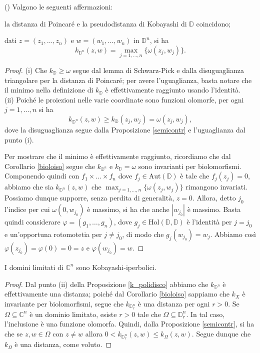 \begin{prop} \label{k_polidisco}
    (\cite[Proposition 2.3.4 and Corollary 2.3.7]{A1}) Valgono le seguenti affermazioni:
    \begin{nlist}
        \item la distanza di Poincaré e la pseudodistanza di Kobayashi di $\mathbb{D}$ coincidono;
        \item dati $z=(z_1,\dots,z_n)$ e $w=(w_1,\dots,w_n)$ in $\mathbb{D}^n$, si ha
        $$k_{\mathbb{D}^n}(z,w)=\max_{j=1,\dots,n}\{\omega(z_j,w_j)\}.$$
    \end{nlist}
\end{prop}
\begin{proof}
    (i) Che $k_{\mathbb{D}}\ge\omega$ segue dal lemma di Schwarz-Pick e dalla disuguaglianza triangolare per la distanza di Poincaré; per avere l'uguaglianza, basta notare che il minimo nella definizione di $k_{\mathbb{D}}$ è effettivamente raggiunto usando l'identità.\\

    (ii) Poiché le proiezioni nelle varie coordinate sono funzioni olomorfe, per ogni $j=1,\dots, n$ si ha
    $$k_{\mathbb{D}^n}(z,w) \ge k_{\mathbb{D}}(z_j,w_j)=\omega(z_j,w_j),$$
    dove la disuguaglianza segue dalla Proposizione \ref{semicontr} e l'uguaglianza dal punto (i).

    Per mostrare che il minimo è effettivamente raggiunto, ricordiamo che dal Corollario \ref{bioloiso} segue che $k_{\mathbb{D}^n}$ e $k_{\mathbb{D}}=\omega$ sono invarianti per biolomorfismi. Componendo quindi con $f_1\times\dots\times f_n$ dove $f_j \in \text{Aut}(\mathbb{D})$ è tale che $f_j(z_j)=0$, abbiamo che sia $k_{\mathbb{D}^n}(z,w)$ che $\displaystyle\max_{j=1,\dots,n}\{\omega(z_j,w_j)\}$ rimangono invariati. Possiamo dunque supporre, senza perdita di generalità, $z=0$. Allora, detto $j_0$ l'indice per cui $\omega(0,w_{j_0})$ è massimo, si ha che anche $|w_{j_0}|$ è massimo. Basta quindi considerare $\varphi=(g_1,\dots,g_n)$, dove $g_j \in\text{Hol}(\mathbb{D},\mathbb{D})$ è l'identità per $j=j_0$ e un'opportuna rotomotetia per $j\not=j_0$, di modo che $g_j(w_{j_0})=w_j$. Abbiamo così $\varphi(z_{j_0})=\varphi(0)=0=z$ e $\varphi(w_{j_0})=w$.
\end{proof}

\begin{cor}
    I domini limitati di $\mathbb{C}^n$ sono Kobayashi-iperbolici.
\end{cor}
\begin{proof}
    Dal punto (ii) della Proposizione \ref{k_polidisco} abbiamo che $k_{\mathbb{D}^n}$ è effettivamente una distanza; poiché dal Corollario \ref{bioloiso} sappiamo che $k_X$ è invariante per biolomorfismi, segue che $k_{\mathbb{D}_r^n}$ è una distanza per ogni $r>0$. Se $\Omega\subseteq\mathbb{C}^n$ è un dominio limitato, esiste $r>0$ tale che $\Omega\subseteq\mathbb{D}_r^n$. In tal caso, l'inclusione è una funzione olomorfa. Quindi, dalla Proposizione \ref{semicontr}, si ha che se $z,w \in \Omega$ con $z\not=w$ allora $0<k_{\mathbb{D}_r^n}(z,w) \le k_{\Omega}(z,w)$. Segue dunque che $k_\Omega$ è una distanza, come voluto.
\end{proof}

